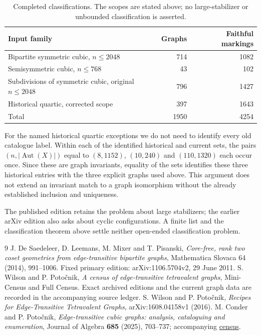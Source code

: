 \documentclass[11pt]{article}
\theoremstyle{definition}\newtheorem{definition}[theorem]{Definition}
\newcommand{\Aut}{\operatorname{Aut}}
\begin{document}
\begin{table}[ht]
\centering
\begin{tabular}{lrr}
\toprule
Input family & Graphs & Faithful markings\\
\midrule
Bipartite symmetric cubic, $n\le2048$ & 714 & 1082\\
Semisymmetric cubic, $n\le768$ & 43 & 102\\
Subdivisions of symmetric cubic, original $n\le2048$ & 796 & 1427\\
Historical quartic, corrected scope & 397 & 1643\\
\midrule
Total & 1950 & 4254\\
\bottomrule
\end{tabular}
\caption{Completed classifications.  The scopes are stated above;
no large-stabilizer or unbounded classification is asserted.}
\end{table}

For the named historical quartic exceptions we do not need to
identify every old catalogue label.  Within each of the identified
historical and current sets, the pairs $(n,|\Aut(X)|)$ equal to
$(8,1152)$, $(10,240)$ and $(110,1320)$ each occur once.  Since
these are graph invariants, equality of the sets identifies these
three historical entries with the three explicit graphs used above.
This argument does not extend an invariant match to a graph
isomorphism without the already established inclusion and uniqueness.



The published edition retains the problem about large stabilizers;
the earlier arXiv edition also asks about cyclic configurations.
A finite list and the classification theorem above settle neither
open-ended classification problem.

\begin{thebibliography}{9}
 J. De Saedeleer, D. Leemans, M. Mixer and T. Pisanski,
\emph{Core-free, rank two coset geometries from edge-transitive
bipartite graphs}, Mathematica Slovaca 64 (2014), 991--1006.
Fixed primary edition: arXiv:1106.5704v2, 29 June 2011.
 S. Wilson and P. Poto\v cnik,
\emph{A census of edge-transitive tetravalent graphs}, Mini-Census
and Full Census.  Exact archived editions and the current graph data
are recorded in the accompanying source ledger.
 S. Wilson and P. Poto\v cnik,
\emph{Recipes for Edge-Transitive Tetravalent Graphs},
arXiv:1608.04158v1 (2016).
 M. Conder and P. Poto\v cnik,
\emph{Edge-transitive cubic graphs: analysis, cataloguing and
enumeration}, Journal of Algebra \textbf{685} (2025), 703--737;
accompanying \href{https://fostercensus.graphsym.net/}{census}.
\end{thebibliography}
\end{document}
